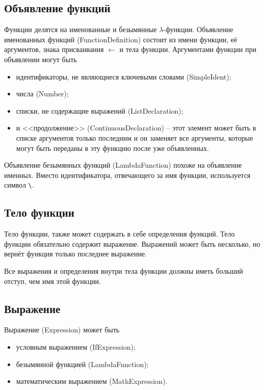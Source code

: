     \subsection{Объявление функций}
        Функции делятся на именованные и безымянные $\lambda$-функции.
        Объявление именованных функций (FunctionDefinition) состоит из имени функции, её аргументов, знака присваивания $\leftarrow$ и тела функции.
        Аргументами функции при объявлении могут быть 
        \begin{itemize}
            \item идентификаторы, не являющиеся ключевыми словами (SimpleIdent);
            \item числа (Number);
            \item списки, не содержащие выражений (ListDeclaration);
            \item и <<продолжение>> (ContinuousDeclaration) -- этот элемент может быть в списке аргументов только последним и он заменяет все аргументы, которые могут быть переданы в эту функцию после уже объявленных.
        \end{itemize}
        
        

        Объявление безымянных функций (LambdaFunction) похоже на объявление именных.
        Вместо идентификатора, отвечающего за имя функции, используется символ \verb,\,.

        

    \subsection{Тело функции}
        Тело функции, также может содержать в себе определения функций.
        Тело функции обязательно содержит выражение.
        Выражений может быть несколько, но вернёт функция только последнее выражение.

        Все выражения и определения внутри тела функции должны иметь больший отступ, чем имя этой функции.

        

    \subsection{Выражение}
        Выражение (Expression) может быть
        \begin{itemize}
            \item условным выражением (IfExpression);
            \item безымянной функцией (LambdaFunction);
            \item математическим выражением (MathExpression).
        \end{itemize}

